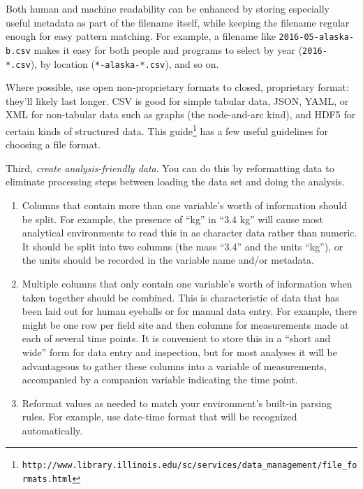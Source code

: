 \documentclass[10pt]{article}
\newcommand{\recommend}[1]{\textit{#1}}
\newcommand{\withurl}[2]{{#1}\footnote{\texttt{#2}}}
\begin{document}
Both human and machine readability can be enhanced by storing especially
useful metadata as part of the filename itself, while keeping the
filename regular enough for easy pattern matching. For example, a
filename like \texttt{2016-05-alaska-b.csv} makes it easy for both
people and programs to select by year (\texttt{2016-*.csv}), by location
(\texttt{*-alaska-*.csv}), and so on.

Where possible, use open non-proprietary formats to closed,
proprietary format: they'll likely last longer.
CSV is good for simple tabular data,
JSON, YAML, or XML for non-tabular data such as graphs (the
node-and-arc kind),
and HDF5 for certain kinds of structured data.
\withurl{This
  guide}{http://www.library.illinois.edu/sc/services/data\_management/file\_formats.html}
has a few useful guidelines for choosing a file format.

Third, \recommend{create analysis-friendly data}.  You can do this by
reformatting data to eliminate processing steps between loading the
data set and doing the analysis.

\begin{enumerate}

\item
  Columns that contain more than one variable's worth of information
  should be split. For example, the presence of ``kg'' in ``3.4 kg''
  will cause most analytical environments to read this in as character
  data rather than numeric. It should be split into two columns (the
  mass ``3.4'' and the units ``kg''), or the units should be recorded
  in the variable name and/or metadata.

\item
  Multiple columns that only contain one variable's worth of information
  when taken together should be combined. This is characteristic of data
  that has been laid out for human eyeballs or for manual data entry.
  For example, there might be one row per field site and then columns
  for measurements made at each of several time points. It is convenient
  to store this in a ``short and wide'' form for data entry and
  inspection, but for most analyses it will be advantageous to gather
  these columns into a variable of measurements, accompanied by a
  companion variable indicating the time point.

\item
  Reformat values as needed to match your environment's built-in parsing
  rules. For example, use date-time format that will be recognized
  automatically.

\end{enumerate}
\end{document}
